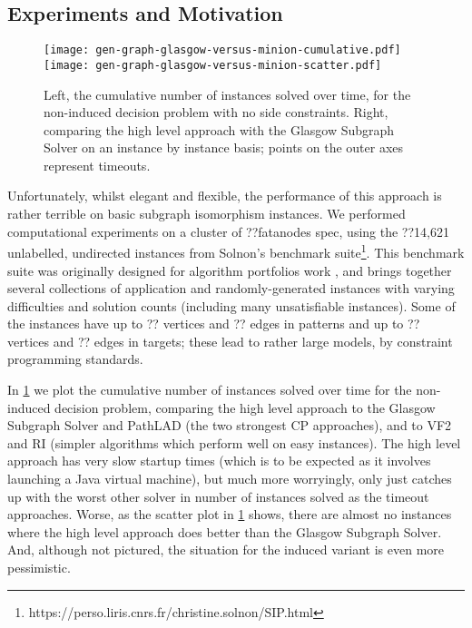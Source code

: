\documentclass[runningheads]{llncs}
\begin{document}
\subsection{Experiments and Motivation}

\begin{figure}[tb]
\texttt{[image: gen-graph-glasgow-versus-minion-cumulative.pdf]}\hfill\texttt{[image: gen-graph-glasgow-versus-minion-scatter.pdf]}

    \caption{Left, the cumulative number of instances solved over time, for the non-induced decision
    problem with no side constraints. Right, comparing the high level approach with the Glasgow
    Subgraph Solver on an instance by instance basis; points on the outer axes represent
    timeouts.}\label{figure:solvers}
\end{figure}

Unfortunately, whilst elegant and flexible, the performance of this approach is rather terrible on
basic subgraph isomorphism instances.  We performed computational experiments on a cluster of
??fatanodes spec, using the ??14,621 unlabelled, undirected instances from Solnon's benchmark
suite\footnote{https://perso.liris.cnrs.fr/christine.solnon/SIP.html}. This benchmark suite was
originally designed for algorithm portfolios work \cite{DBLP:conf/lion/KotthoffMS16}, and brings
together several collections of application and randomly-generated instances with varying
difficulties and solution counts (including many unsatisfiable instances). Some of the instances
have up to ?? vertices and ?? edges in patterns and up to ?? vertices and ?? edges in
targets; these lead to rather large models, by constraint programming standards.

In \cref{figure:solvers} we plot the cumulative number of instances solved over time for
the non-induced decision problem, comparing the high level approach to the Glasgow Subgraph Solver
\cite{DBLP:conf/gg/McCreeshP020} and PathLAD \cite{DBLP:conf/lion/KotthoffMS16} (the two strongest
CP approaches), and to VF2 \cite{DBLP:journals/pami/CordellaFSV04} and RI
\cite{DBLP:journals/bmcbi/BonniciGPSF13} (simpler algorithms which perform well on easy instances).
The high level approach has very slow startup times (which is to be expected as it involves
launching a Java virtual machine), but much more worryingly, only just catches up with the worst
other solver in number of instances solved as the timeout approaches. Worse, as the scatter plot in
\cref{figure:solvers} shows, there are almost no instances where the high level approach
does better than the Glasgow Subgraph Solver. And, although not pictured, the situation for the
induced variant is even more pessimistic.
\end{document}
